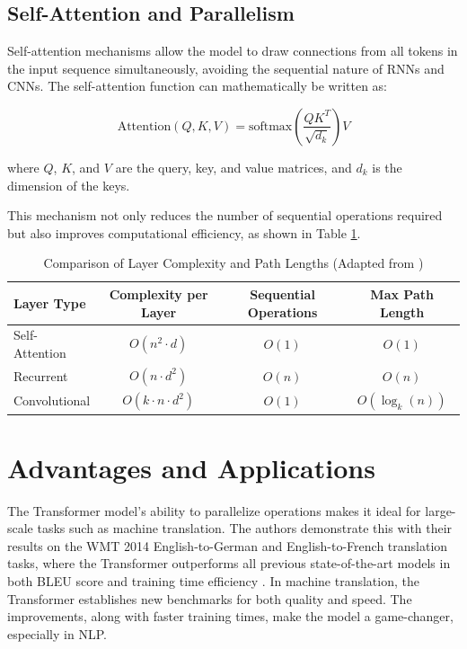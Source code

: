 \documentclass[runningheads]{llncs}
\begin{document}
\subsection{Self-Attention and Parallelism}
Self-attention mechanisms allow the model to draw connections from all tokens in the input sequence simultaneously, avoiding the sequential nature of RNNs and CNNs. 
The self-attention function can mathematically be written as:

\[
\text{Attention}(Q, K, V) = \text{softmax} \left( \frac{QK^T}{\sqrt{d_k}} \right)V
\]

where $Q$, $K$, and $V$ are the query, key, and value matrices, and $d_k$ is the dimension of the keys.

This mechanism not only reduces the number of sequential operations required but also improves computational efficiency, as shown in Table \ref{tab:complexity}.



\begin{table}
    \centering
    \caption{Comparison of Layer Complexity and Path Lengths (Adapted from \cite{vaswani2017attention})}
    \label{tab:complexity}
    \begin{tabular}{lccc}
    \toprule
    Layer Type & Complexity per Layer & Sequential Operations & Max Path Length \\
    \midrule
    Self-Attention & $O(n^2 \cdot d)$ & $O(1)$ & $O(1)$ \\
    Recurrent & $O(n \cdot d^2)$ & $O(n)$ & $O(n)$ \\
    Convolutional & $O(k \cdot n \cdot d^2)$ & $O(1)$ & $O(\log_k(n))$ \\
    \bottomrule
    \end{tabular}
\end{table}

\section{Advantages and Applications}
The Transformer model's ability to parallelize operations makes it ideal for large-scale tasks such as machine translation. The authors demonstrate this with their results on the WMT 2014 English-to-German and English-to-French translation tasks, where the Transformer outperforms all previous state-of-the-art models in both BLEU score and training time efficiency \cite{vaswani2017attention}.
In machine translation, the Transformer establishes new benchmarks for both quality and speed.
The improvements, along with faster training times, make the model a game-changer, especially in NLP.
\end{document}
